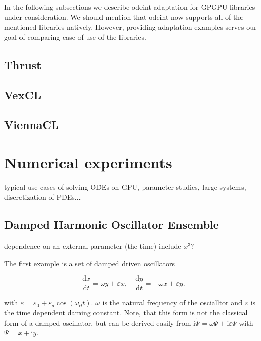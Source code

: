 \documentclass[1p]{elsarticle}
\newcommand {\de} {\mbox{d}}
\newcommand {\ii} {\text{i}}
\begin{document}
In the following subsections we describe odeint adaptation for GPGPU libraries
under consideration. We should mention that odeint now supports all of the
mentioned libraries natively. However, providing adaptation examples serves our
goal of comparing ease of use of the libraries.

\subsection{Thrust}
\subsection{VexCL}
\subsection{ViennaCL}














\section{Numerical experiments}

typical use cases of solving ODEs on GPU, parameter studies, large systems, discretization of PDEs...





%
%
\subsection{Damped Harmonic Oscillator Ensemble}

dependence on an external parameter (the time)
include $x^3$?

The first example is a set of damped driven oscillators 

\begin{equation} \label{eq:dampedsystem}
    \frac{\de x}{\de t} = \omega y + \varepsilon x, \quad 
    \frac{\de y}{\de t} = -\omega x + \varepsilon y.
\end{equation}

with $\varepsilon = \varepsilon_0 + \varepsilon_a \cos \left( \omega_d
t \right)$. $\omega$ is the natural frequency of the oscialltor and $\varepsilon$ is the time dependent daming constant. 
Note, that this form is not the classical form of a damped oscillator, but can be derived easily from $\ii \dot{\Psi} = \omega \Psi + \ii \varepsilon \Psi$ with $\Psi = x + \ii y$.
\end{document}
